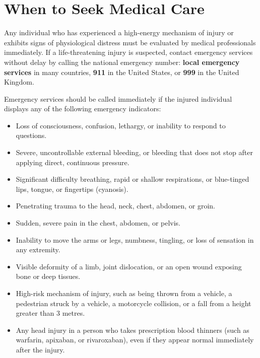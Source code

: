 \section*{When to Seek Medical Care}
Any individual who has experienced a high-energy mechanism of injury or exhibits signs of physiological distress must be evaluated by medical professionals immediately. If a life-threatening injury is suspected, contact emergency services without delay by calling the national emergency number: \textbf{local emergency services} in many countries, \textbf{911} in the United States, or \textbf{999} in the United Kingdom.

Emergency services should be called immediately if the injured individual displays any of the following emergency indicators:
\begin{itemize}
    \item Loss of consciousness, confusion, lethargy, or inability to respond to questions.
    \item Severe, uncontrollable external bleeding, or bleeding that does not stop after applying direct, continuous pressure.
    \item Significant difficulty breathing, rapid or shallow respirations, or blue-tinged lips, tongue, or fingertips (cyanosis).
    \item Penetrating trauma to the head, neck, chest, abdomen, or groin.
    \item Sudden, severe pain in the chest, abdomen, or pelvis.
    \item Inability to move the arms or legs, numbness, tingling, or loss of sensation in any extremity.
    \item Visible deformity of a limb, joint dislocation, or an open wound exposing bone or deep tissues.
    \item High-risk mechanism of injury, such as being thrown from a vehicle, a pedestrian struck by a vehicle, a motorcycle collision, or a fall from a height greater than 3 metres.
    \item Any head injury in a person who takes prescription blood thinners (such as warfarin, apixaban, or rivaroxaban), even if they appear normal immediately after the injury.
\end{itemize}

